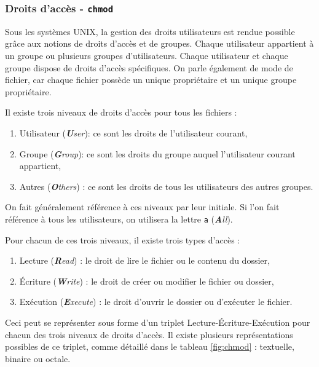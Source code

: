 \subsubsection{Droits d'accès - \texttt{chmod}} \label{sec:chmod}
\vspace{-3mm}

Sous les systèmes UNIX, la gestion des droits utilisateurs est rendue possible grâce aux notions de droits d'accès et de groupes. Chaque utilisateur appartient à un groupe ou plusieurs groupes d'utilisateurs. Chaque utilisateur et chaque groupe dispose de droits d'accès spécifiques. On parle également de mode de fichier, car chaque fichier possède un unique propriétaire et un unique groupe propriétaire.

Il existe trois niveaux de droits d'accès pour tous les fichiers : 
\begin{enumerate}
    \item Utilisateur (\textit{\textbf{U}ser}): ce sont les droits de l'utilisateur courant,
    \item Groupe (\textit{\textbf{G}roup}): ce sont les droits du groupe auquel l'utilisateur courant appartient,
    \item Autres (\textit{\textbf{O}thers}) : ce sont les droits de tous les utilisateurs des autres groupes.
\end{enumerate}
On fait généralement référence à ces niveaux par leur initiale. Si l'on fait référence à tous les utilisateurs, on utilisera la lettre \texttt{a} (\textit{\textbf{A}ll}).

Pour chacun de ces trois niveaux, il existe trois types d'accès :
\begin{enumerate}
    \item Lecture (\textit{\textbf{R}ead}) : le droit de lire le fichier ou le contenu du dossier,
    \item Écriture (\textit{\textbf{W}rite}) : le droit de créer ou modifier le fichier ou dossier,
    \item Exécution (\textit{\textbf{E}xecute}) : le droit d'ouvrir le dossier ou d'exécuter le fichier.
\end{enumerate}

\newpage

Ceci peut se représenter sous forme d'un triplet Lecture-Écriture-Exécution pour chacun des trois niveaux de droits d'accès. Il existe plusieurs représentations possibles de ce triplet, comme détaillé dans le tableau \ref{fig:chmod} : textuelle, binaire ou octale.

